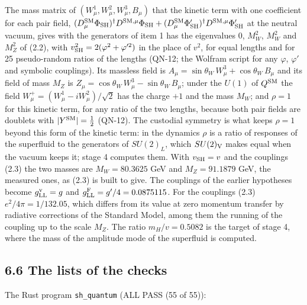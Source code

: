 \documentclass[
  10pt,
]{article}
\begin{document}
The mass matrix of \((W^1_\mu,W^2_\mu,W^3_\mu,B_\mu)\) that the kinetic
term with one coefficient for each pair field,
\((D^{\rm SM}_\mu\Phi_{\rm SH})^\dagger D^{{\rm SM},\mu}\Phi_{\rm SH}+(D^{\rm SM}_\mu\Phi'_{\rm SH})^\dagger D^{{\rm SM},\mu}\Phi'_{\rm SH}\)
at the neutral vacuum, gives with the generators of item 1 has the
eigenvalues \(0\), \(M_W^2\), \(M_W^2\) and \(M_Z^2\) of (2.2), with
\(v_{\rm SH}^2=2(\varphi^2+\varphi'^2)\) in the place of \(v^2\), for
equal lengths and for 25 pseudo-random ratios of the lengths (QN-12; the
Wolfram script for any \(\varphi\), \(\varphi'\) and symbolic
couplings). Its massless field is
\(A_\mu=\sin\theta_W\,W^3_\mu+\cos\theta_W\,B_\mu\) and its field of
mass \(M_Z\) is \(Z_\mu=\cos\theta_W\,W^3_\mu-\sin\theta_W\,B_\mu\);
under the \(U(1)\) of \(Q^{\rm SM}\) the field
\(W^+_\mu=(W^1_\mu-iW^2_\mu)/\sqrt2\) has the charge \(+1\) and the mass
\(M_W\); and \(\rho=1\) for this kinetic term, for any ratio of the two
lengths, because both pair fields are doublets with
\(\lvert Y^{\rm SM}\rvert=\tfrac12\) (QN-12). The custodial symmetry is
what keeps \(\rho=1\) beyond this form of the kinetic term: in the
dynamics \(\rho\) is a ratio of responses of the superfluid to the
generators of \(SU(2)_L\), which \(SU(2)_{\rm V}\) makes equal when the
vacuum keeps it; stage 4 computes them. With \(v_{\rm SH}=v\) and the
couplings (2.3) the two masses are \(M_W=80.3625\) GeV and
\(M_Z=91.1879\) GeV, the measured ones, as (2.3) is built to give. The
couplings of the earlier hypotheses become \(g^{\rm v}_{\rm LL}=g\) and
\(g^{\rm F}_{\rm LL}=g'/4=0.0875115\). For the couplings (2.3)
\(e^2/4\pi=1/132.05\), which differs from its value at zero momentum
transfer by radiative corrections of the Standard Model, among them the
running of the coupling up to the scale \(M_Z\). The ratio
\(m_H/v=0.5082\) is the target of stage 4, where the mass of the
amplitude mode of the superfluid is computed.

\hypertarget{the-lists-of-the-checks}{%
\subsection{6.6 The lists of the checks}\label{the-lists-of-the-checks}}

The Rust program \texttt{sh\_quantum} (ALL PASS (55 of 55)):
\end{document}
